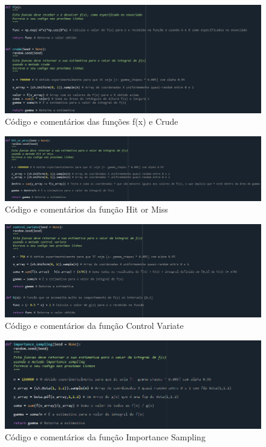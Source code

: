 \documentclass{article}
\begin{document}
    \begin{figure}[H]
        \centering
        \includegraphics[width= 1 \textwidth]{Código f(x) e crude.png}
        \caption{Código e comentários das funções f(x) e Crude}
        \label{fig:grafico}
    \end{figure}
    
    \begin{figure}[H]
        \centering
        \includegraphics[width= 1 \textwidth]{Código hit or miss.png}
        \caption{Código e comentários da função Hit or Miss}
        \label{fig:grafico}
    \end{figure}

    \begin{figure}[H]
        \centering
        \includegraphics[width= 1 \textwidth]{Código control variate.png}
        \caption{Código e comentários da função Control Variate}
        \label{fig:grafico}
    \end{figure}
    
    \begin{figure}[H]
        \centering
        \includegraphics[width= 1 \textwidth]{Código importance sampling.png}
        \caption{Código e comentários da função Importance Sampling}
        \label{fig:grafico}
    \end{figure}
\end{document}
